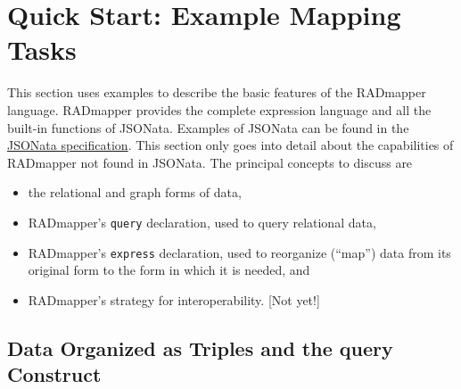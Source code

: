 \documentclass[9pt,letterpaper]{article}
\newcommand{\stt}[1]{\texttt{#1}} %
\begin{document}


\section{Quick Start: Example Mapping Tasks}

This section uses examples to describe the basic features of the RADmapper language.
RADmapper provides the complete expression language and all the built-in functions of JSONata.
Examples of JSONata can be found in the \href{https://jsonata.org/}{JSONata specification}.
This section only goes into detail about the capabilities of RADmapper not found in JSONata.
The principal concepts to discuss are

\begin{itemize}
  \item{the relational and graph forms of data,}
  \item{RADmapper's \stt{query} declaration, used to query relational data,}
  \item{RADmapper's \stt{express} declaration, used to reorganize (``map'') data from its original form to the form in which it is needed, and}
  \item{RADmapper's strategy for interoperability. [Not yet!]}
\end{itemize}


\subsection{Data Organized as Triples and the query Construct}
\end{document}
